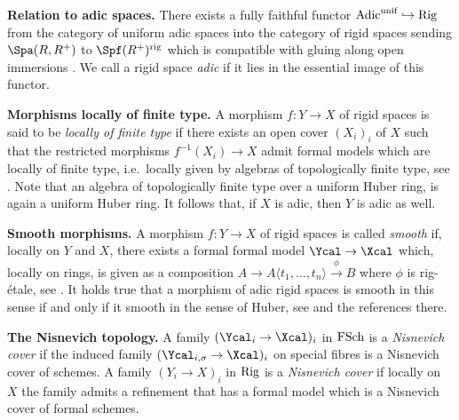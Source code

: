 \documentclass[colorinlistoftodos,article,11pt,reqno]{article}
\newcommand{\rig}{\textup{rig}}
\newcommand{\Rig}{\textup{Rig}}
\newcommand{\FSch}{\textup{FSch}}
\renewcommand{\to}[1][]{\overset{#1}{\rightarrow}}
\newcommand{\inj}[1][]{\overset{#1}{\hookrightarrow}}		%
\begin{document}
\vspace{6pt}\noindent\textbf{Relation to adic spaces.} There exists a fully faithful functor $\textup{Adic}^\textup{unif}\inj\Rig$ from the category of uniform adic spaces into the category of rigid spaces sending $\Spa(R,R^+)$ to $\Spf(R^+)^\rig$ which is compatible with gluing along open immersions \cite[\S 1.2]{AGV}.
We call a rigid space \emph{adic} if it lies in the essential image of this functor.

\vspace{6pt}\noindent\textbf{Morphisms locally of finite type.}
A morphism $f\colon Y\to X$ of rigid spaces is said to be \emph{locally of finite type} if there exists an open cover $(X_i)_i$ of $X$ such that the restricted morphisms $f^{-1}(X_i)\to X$ admit formal models which are locally of finite type, i.e.\ locally given by algebras of topologically finite type, see  \cite[ch.~II, sec.~2.3]{fuji-kato}.
Note that an algebra of topologically finite type over a uniform Huber ring, is again a uniform Huber ring. It follows that, if $X$ is adic, then $Y$ is adic as well.

\vspace{6pt}\noindent\textbf{Smooth morphisms.}
A morphism $f\colon Y\to X$ of rigid spaces is called \emph{smooth} if, locally on $Y$ and $X$, there exists a formal formal model $\Ycal\to\Xcal$ which, locally on rings, is given as a composition $A\to A\langle t_1,\ldots,t_n\rangle \to[\phi] B$ where $\phi$ is rig-\'{e}tale, see \cite[1.3.3., 1.3.13]{AGV}.
It holds true that a morphism of adic rigid spaces is smooth in this sense if and only if it smooth in the sense of Huber, see \cite[1.3.14]{AGV} and the references there.

\vspace{6pt}\noindent\textbf{The Nisnevich topology.}
A family $(\Ycal_i\to\Xcal)_i$ in $\FSch$ is a \emph{Nisnevich cover} if the induced family $(\Ycal_{i,\sigma}\to \Xcal)_i$ on special fibres is a Nisnevich cover of schemes. A family $(Y_i\to X)_i$ in $\Rig$ is a \emph{Nisnevich cover} if locally on $X$ the family admits a refinement that has a formal model which is a Nisnevich cover of formal schemes.
\end{document}
